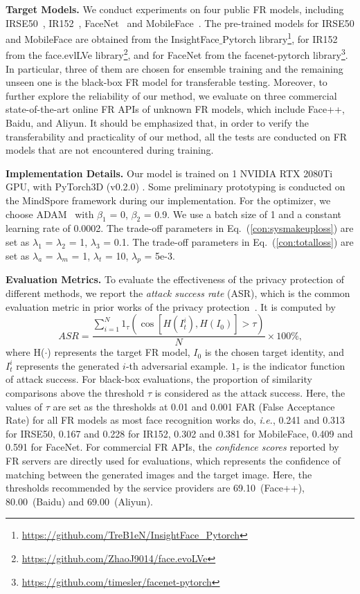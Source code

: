 \documentclass[10pt,journal,compsoc]{IEEEtran}
\begin{document}
{\bf Target Models.}
We conduct experiments on four public FR models, including IRSE50~\cite{hu2018squeeze}, IR152~\cite{he2016deep}, FaceNet~\cite{schroff2015facenet} and MobileFace~\cite{deng2019arcface}. The pre-trained models for IRSE50 and MobileFace are obtained from the InsightFace$\_$Pytorch library\footnote[5]{\url{https://github.com/TreB1eN/InsightFace_Pytorch}}, for IR152 from the face.evlLVe library\footnote[6]{\url{https://github.com/ZhaoJ9014/face.evoLVe}}, and for FaceNet from the facenet-pytorch library\footnote[7]{\url{https://github.com/timesler/facenet-pytorch}}. In particular, three of them are chosen for ensemble training and the remaining unseen one is the black-box FR model for transferable testing. Moreover, to further explore the reliability of our method, we evaluate on three commercial state-of-the-art online FR APIs of unknown FR models, which include Face++, Baidu, and Aliyun. It should be emphasized that, in order to verify the transferability and practicality of our method, all the tests are conducted on FR models that are not encountered during training.

{\bf Implementation Details.}
Our model is trained on 1 NVIDIA RTX 2080Ti GPU, with PyTorch3D (v0.2.0) \cite{ravi2020accelerating}. Some preliminary prototyping is conducted on the MindSpore framework during our implementation.
For the optimizer, we choose ADAM~\cite{kingma2014adam} with $\beta_1$ = 0, $\beta_2$ = 0.9. We use a batch size of 1 and a constant learning rate of 0.0002. The trade-off parameters in Eq.~(\ref{con:sysmakeuploss}) are set as $\lambda_1$ = $\lambda_2$ = 1, $\lambda_3$ = 0.1. The trade-off parameters in Eq.~(\ref{con:totalloss}) are set as $\lambda_a$ = $\lambda_m$ = 1, $\lambda_t$ = 10, $\lambda_p$ = 5e-3.

{\bf Evaluation Metrics.}
To evaluate the effectiveness of the privacy protection of different methods, we report the \emph{attack success rate} (ASR), which is the common evaluation metric in prior works of the privacy protection~\cite{yin2021adv,xiao2021improving,hu2022protecting}. It is computed by
\begin{equation}
	ASR=\frac{\sum_{i=1}^{N} 1_{\tau}\left(\cos \left[H\left(I_{t}^{i}\right), H\left({I}_{0}\right)\right]>\tau\right)}{N} \times 100 \%\text{,}
\end{equation}
where H($\cdot$) represents the target FR model, $I_0$ is the chosen target identity, and $I_t^i$ represents the generated $i$-th adversarial example. $1_{\tau}$ is the indicator function of attack success.
For black-box evaluations, the proportion of similarity comparisons above the threshold $\tau$ is considered as the attack success. 
%
Here, the values of $\tau$ are set as the thresholds at 0.01 and 0.001 FAR (False Acceptance Rate) for all FR models as most face recognition works do, \emph{i.e.}, 0.241 and 0.313 for IRSE50, 0.167 and 0.228 for IR152, 0.302 and 0.381 for MobileFace, 0.409 and 0.591 for FaceNet. 
%
For commercial FR APIs, the \emph{confidence scores} reported by FR servers are directly used for evaluations, which represents the confidence of matching between the generated images and the target image. Here, the thresholds recommended by the service providers are 69.10~(Face++), 80.00~(Baidu) and 69.00~(Aliyun).
\end{document}
